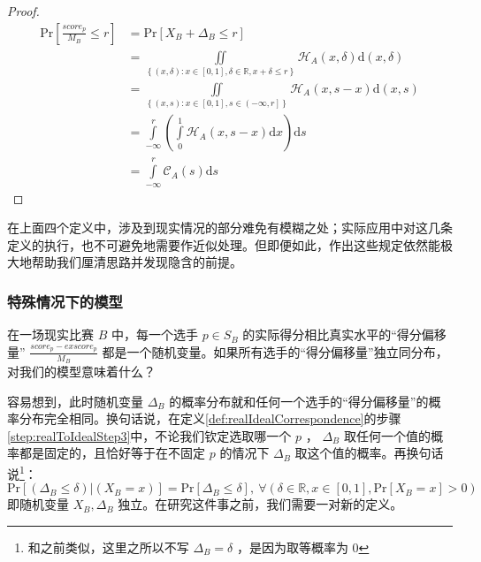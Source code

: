             \begin{proof}
                \begin{align*}
                    \mathrm{Pr}\left[\frac{\textit{score}_p}{M_B}\leq r\right]
                    &=\mathrm{Pr}\left[X_B+\Delta_B\leq r\right] \\
                    &=\iint\limits_{\left\{(x,\delta):x\in\left[0,1\right],\delta\in\mathbb{R},x+\delta\leq r\right\}}\mathcal{H}_A(x,\delta)\mathrm{d}(x,\delta) \\
                    &=\iint\limits_{\left\{(x,s):x\in\left[0,1\right],s\in\left(-\infty,r\right]\right\}}\mathcal{H}_A(x,s-x)\mathrm{d}(x,s) \\
                    &=\int\limits_{-\infty}^r\left(\int\limits_0^1 \mathcal{H}_A(x,s-x)\mathrm{d}x\right)\mathrm{d}s \\
                    &=\int\limits_{-\infty}^r \mathcal{C}_A(s)\mathrm{d}s
                \end{align*}
            \end{proof}

            在上面四个定义中，涉及到现实情况的部分难免有模糊之处；实际应用中对这几条定义的执行，也不可避免地需要作近似处理。但即便如此，作出这些规定依然能极大地帮助我们厘清思路并发现隐含的前提。

        \subsubsection{特殊情况下的模型}

            在一场现实比赛 $B$ 中，每一个选手 $p\in S_B$ 的实际得分相比真实水平的“得分偏移量” $\frac{\textit{score}_p-\textit{exscore}_p}{M_B}$ 都是一个随机变量。如果所有选手的“得分偏移量”独立同分布，对我们的模型意味着什么？

            容易想到，此时随机变量 $\Delta_B$ 的概率分布就和任何一个选手的“得分偏移量”的概率分布完全相同。换句话说，在定义\ref{def:realIdealCorrespondence}的步骤\ref{step:realToIdealStep3}中，不论我们钦定选取哪一个 $p$ ， $\Delta_B$ 取任何一个值的概率都是固定的，且恰好等于在不固定 $p$ 的情况下 $\Delta_B$ 取这个值的概率。再换句话说\footnote{和之前类似，这里之所以不写 $\Delta_B=\delta$ ，是因为取等概率为 $0$ }：$$\mathrm{Pr}\left[(\Delta_B\leq\delta)|(X_B=x)\right]=\mathrm{Pr}\left[\Delta_B\leq\delta\right],\ \forall \left(\delta\in\mathbb{R},x\in\left[0,1\right],\mathrm{Pr}\left[X_B=x\right]>0\right)$$即随机变量 $X_B,\Delta_B$ 独立。在研究这件事之前，我们需要一对新的定义。

